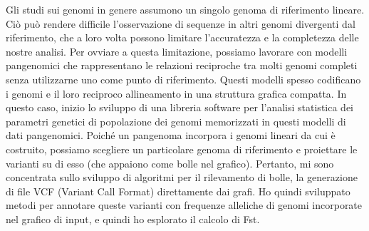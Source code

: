 Gli studi sui genomi in genere assumono un singolo genoma di riferimento lineare. Ciò può rendere difficile l'osservazione di sequenze in altri genomi divergenti dal riferimento, che a loro volta possono limitare l'accuratezza e la completezza delle nostre analisi. Per ovviare a questa limitazione, possiamo lavorare con modelli pangenomici che rappresentano le relazioni reciproche tra molti genomi completi senza utilizzarne uno come punto di riferimento. Questi modelli spesso codificano i genomi e il loro reciproco allineamento in una struttura grafica compatta. In questo caso, inizio lo sviluppo di una libreria software per l'analisi statistica dei parametri genetici di popolazione dei genomi memorizzati in questi modelli di dati pangenomici. Poiché un pangenoma incorpora i genomi lineari da cui è costruito, possiamo scegliere un particolare genoma di riferimento e proiettare le varianti su di esso (che appaiono come bolle nel grafico). Pertanto, mi sono concentrata sullo sviluppo di algoritmi per il rilevamento di bolle, la generazione di file VCF (Variant Call Format) direttamente dai grafi. Ho quindi sviluppato metodi per annotare queste varianti con frequenze alleliche di genomi incorporate nel grafico di input, e quindi ho esplorato il calcolo di Fst.






